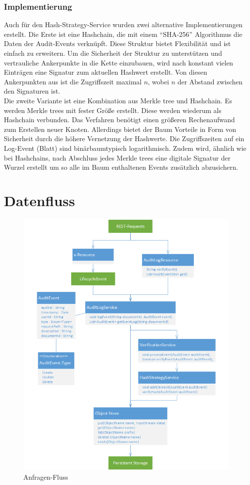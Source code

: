 \subsubsection{Implementierung}
Auch für den Hash-Strategy-Service wurden zwei alternative Implementierungen erstellt. Die Erste ist eine Hashchain, die mit einem "`SHA-256"' Algorithmus die Daten der Audit-Events verknüpft. Diese Struktur bietet Flexibilität und ist einfach zu erweitern. Um die Sicherheit der Struktur zu unterstützen und vertrauliche Ankerpunkte in die Kette einzubauen, wird nach konstant vielen Einträgen eine Signatur zum aktuellen Hashwert erstellt. Von diesen Ankerpunkten aus ist die Zugriffszeit maximal $n$, wobei $n$ der Abstand zwischen den Signaturen ist.\\
Die zweite Variante ist eine Kombination aus Merkle tree und Hashchain. Es werden Merkle trees mit fester Größe erstellt. Diese werden wiederum als Hashchain verbunden. Das Verfahren benötigt einen größeren Rechenaufwand zum Erstellen neuer Knoten. Allerdings bietet der Baum Vorteile in Form von Sicherheit durch die höhere Vernetzung der Hashwerte. Die Zugriffszeiten auf ein Log-Event (Blatt) sind binärbaumtypisch logarithmisch. Zudem wird, ähnlich wie bei Hashchains, nach Abschluss jedes Merkle trees eine digitale Signatur der Wurzel erstellt um so alle im Baum enthaltenen Events zusätzlich abzusichern.

\section{Datenfluss}

\begin{figure}[!hbt]
	\includegraphics[width=1\textwidth]{content/pictures/auditflow}
	\caption{Anfragen-Fluss}
	\label{fig:auditflow}
\end{figure}

